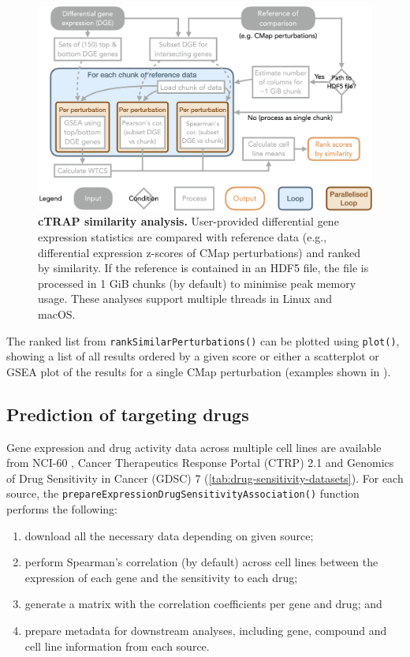 \begin{figure}[!ht]
  \includegraphics[width=.8\textwidth]{images/ctrap/analysis}
  \centering
  \caption[cTRAP similarity analysis]{\textbf{cTRAP similarity analysis.} User-provided differential gene expression statistics are compared with reference data (e.g., differential expression z-scores of CMap perturbations) and ranked by similarity. If the reference is contained in an HDF5 file, the file is processed in 1 GiB chunks (by default) to minimise peak memory usage. These analyses support multiple threads in Linux and macOS.}
  \label{fig:ctrap-analyses}
\end{figure}

The ranked list from \texttt{rankSimilarPerturbations()} can be plotted using \texttt{plot()}, showing a list of all results ordered by a given score or either a scatterplot or GSEA plot of the results for a single CMap perturbation (examples shown in ).

\pagebreak
\subsection{Prediction of targeting drugs}

Gene expression and drug activity data across multiple cell lines are available from NCI-60 \cite{shoemaker:2006wi}, Cancer Therapeutics Response Portal (CTRP) 2.1 \cite{seashore-ludlow:2015ws} and Genomics of Drug Sensitivity in Cancer (GDSC) 7 \cite{yang:2012vk} (\autoref{tab:drug-sensitivity-datasets}). For each source, the \texttt{prepareExpressionDrugSensitivityAssociation()} function performs the following:

\begin{enumerate}
	\item download all the necessary data depending on given source;
	\item perform Spearman’s correlation (by default) across cell lines between the expression of each gene and the sensitivity to each drug;
	\item generate a matrix with the correlation coefficients per gene and drug; and
	\item prepare metadata for downstream analyses, including gene, compound and cell line information from each source.
\end{enumerate}

